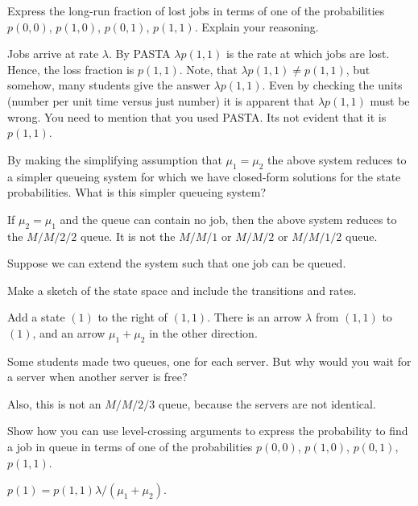 \newpage

\begin{exercise}[201904]
  Express the long-run fraction of lost jobs in terms of one of the probabilities $p(0,0)$, $p(1,0)$, $p(0, 1)$, $p(1, 1)$. Explain your reasoning.
\begin{solution}
  Jobs arrive at rate $\lambda$.
  By PASTA $\lambda p(1, 1)$ is the rate at which jobs are lost.
  Hence, the loss fraction is $p(1, 1)$.
  Note, that $\lambda p(1,1) \neq p(1,1)$, but somehow, many students give the answer $\lambda p(1,1)$.
  Even by checking the units (number per unit time versus just number) it is apparent that $\lambda p(1,1)$ must be wrong.
  You need to mention that you used PASTA.
  Its not evident that it is $p(1, 1)$.
\end{solution}
\end{exercise}


\begin{exercise}[201904]
  By making the simplifying assumption that $\mu_1 = \mu_2$ the above system reduces to a simpler queueing system for which we have closed-form solutions for the state probabilities.
What is this simpler queueing system?
\begin{solution}
  If $\mu_2=\mu_1$ and the queue can contain no job, then the above system reduces to the $M/M/2/2$ queue. It is not the $M/M/1$ or $M/M/2$ or $M/M/1/2$ queue. 
\end{solution}
\end{exercise}


Suppose we can extend the system such that one job can be queued.

\begin{exercise}[201904] 
Make a sketch of the state space and include the transitions and rates. 
\begin{solution}
  Add a state $(1)$ to the right of $(1,1)$. There is an arrow $\lambda$ from $(1,1)$ to $(1)$, and an arrow $\mu_1 + \mu_2$ in the other direction.

  Some students made two queues, one for each server. But why would you wait for a server when another server is free? 

  Also, this is not an $M/M/2/3$ queue, because the servers are not identical.
\end{solution}
\end{exercise}

\begin{exercise}[201904]
  Show how you can use level-crossing arguments to express the probability to find a job in queue in terms of one of the probabilities $p(0,0)$, $p(1,0)$, $p(0, 1)$, $p(1, 1)$. 
\begin{solution}
$p(1) = p(1,1) \lambda /( \mu_1+\mu_2)$. 
\end{solution}
\end{exercise}



